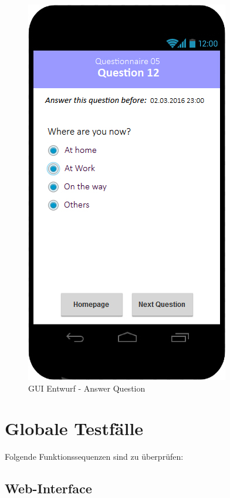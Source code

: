 \documentclass[a4paper]{scrreprt}
\begin{document}
            \vspace*{1cm}
            \begin{figure}[ht]
                \centering
                \includegraphics[scale = 0.3]{android_answer.jpg}
                \caption{GUI Entwurf - Answer Question}
            \end{figure}	

    \chapter{Globale Testfälle}

        Folgende Funktionssequenzen sind zu \"uberpr\"ufen:

        \section{\gls{Web-Interface}}
\end{document}

